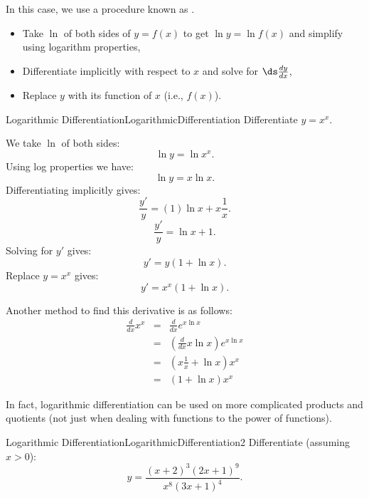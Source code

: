In this case, we use a procedure known as .

\begin{formulabox}
\begin{itemize}
\item Take $\ln$ of both sides of $y=f(x)$ to get $\ln y=\ln f(x)$ and simplify using logarithm properties,
\item Differentiate implicitly with respect to $x$ and solve for $\ds\frac{dy}{dx}$,
\item Replace $y$ with its function of $x$ (i.e., $f(x)$).
\end{itemize}
\end{formulabox}

\begin{example}{Logarithmic Differentiation}{LogarithmicDifferentiation}
Differentiate $y=x^x$.
\end{example}

\begin{solution} 
We take $\ln$ of both sides:
$$\ln y=\ln x^x.$$
Using log properties we have:
$$\ln y = x\ln x.$$
Differentiating implicitly gives:
$$\frac{y'}{y}=(1)\ln x+x\frac{1}{x}.$$
$$\frac{y'}{y}=\ln x+1.$$
Solving for $y'$ gives:
$$y'=y(1+\ln x).$$
Replace $y=x^x$ gives:
$$y'=x^x(1+\ln x).$$

Another method to find this derivative is as follows:
\begin{eqnarray*}
\frac{d}{dx}x^x&=&\frac{d}{dx}e^{x\ln x}\\
&=&\left(\frac{d}{dx}x\ln x\right)e^{x\ln x}\\
&=&(x\frac{1}{x}+\ln x)x^x\\
&=&(1+\ln x)x^x
\end{eqnarray*}
\end{solution}

In fact, logarithmic differentiation can be used on more complicated
products and quotients (not just when dealing with functions to the
power of functions).

\begin{example}{Logarithmic Differentiation}{LogarithmicDifferentiation2}
Differentiate (assuming $x>0$):
$$y=\frac{(x+2)^3(2x+1)^9}{x^8(3x+1)^4}.$$
\vspace{-0.5cm}
\end{example}

